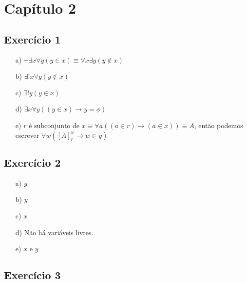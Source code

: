 \documentclass{article}
\begin{document}
\section*{Capítulo 2}

\subsection*{Exercício 1}

\begin{enumerate}
    \item[a)] $\neg \exists x \forall y (y \in x) \equiv \forall x \exists y (y \notin x)$
    \item[b)] $\exists ! x \forall y (y \notin x)$
    \item[c)] $\exists ! y (y \in x)$
    \item[d)] $\exists x \forall y ((y \in x) \rightarrow y = \phi)$
    \item[e)] $r \text{ é subconjunto de } x \equiv \forall a ((a \in r) \rightarrow (a \in x)) \equiv A$, então podemos escrever $\forall w ([A]_r^w \rightarrow w \in y)$
\end{enumerate}

\subsection*{Exercício 2}

\begin{enumerate}
    \item[a)] $y$
    \item[b)] $y$
    \item[c)] $x$
    \item[d)] Não há variáveis livres.
    \item[e)] $x$ e $y$
 \end{enumerate}
 
\subsection*{Exercício 3}
\end{document}
